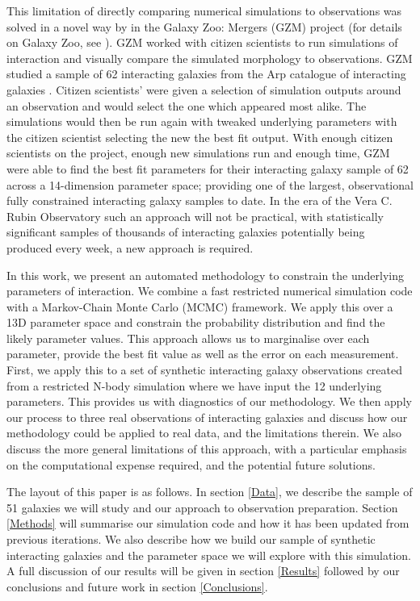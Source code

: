 This limitation of directly comparing numerical simulations to observations was solved in a novel way by \citet{2016MNRAS.459..720H} in the Galaxy Zoo: Mergers (GZM) project (for details on Galaxy Zoo, see \citet{2008MNRAS.389.1179L}). GZM worked with citizen scientists to run simulations of interaction and visually compare the simulated morphology to observations. GZM studied a sample of 62 interacting galaxies from the Arp catalogue of interacting galaxies \citep{1966ApJS...14....1A}. Citizen scientists' were given a selection of simulation outputs around an observation and would select the one which appeared most alike. The simulations would then be run again with tweaked underlying parameters with the citizen scientist selecting the new the best fit output. With enough citizen scientists on the project, enough new simulations run and enough time, GZM were able to find the best fit parameters for their interacting galaxy sample of 62 across a 14-dimension parameter space; providing one of the largest, observational fully constrained interacting galaxy samples to date. In the era of the Vera C. Rubin Observatory such an approach will not be practical, with statistically significant samples of thousands of interacting galaxies potentially being produced every week, a new approach is required.

In this work, we present an automated methodology to constrain the underlying parameters of interaction. We combine a fast restricted numerical simulation code with a Markov-Chain Monte Carlo (MCMC) framework. We apply this over a 13D parameter space and constrain the probability distribution and find the likely parameter values. This approach allows us to marginalise over each parameter, provide the best fit value as well as the error on each measurement. First, we apply this to a set of synthetic interacting galaxy observations created from a restricted N-body simulation where we have input the 12 underlying parameters. This provides us with diagnostics of our methodology. We then apply our process to three real observations of interacting galaxies and discuss how our methodology could be applied to real data, and the limitations therein. We also discuss the more general limitations of this approach, with a particular emphasis on the computational expense required, and the potential future solutions.

The layout of this paper is as follows. In section \ref{Data}, we describe the sample of 51 galaxies we will study and our approach to observation preparation. Section \ref{Methods} will summarise our simulation code and how it has been updated from previous iterations. We also describe how we build our sample of synthetic interacting galaxies and the parameter space we will explore with this simulation. A full discussion of our results will be given in section \ref{Results} followed by our conclusions and future work in section \ref{Conclusions}.

